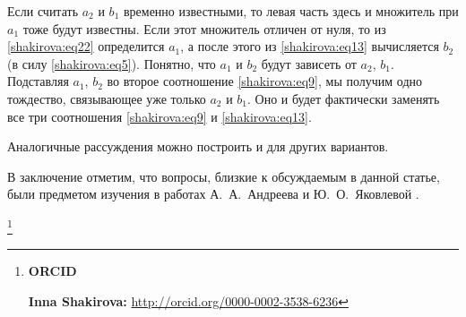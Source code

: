 Если считать $a_2$ и $b_1$ временно известными, то левая часть здесь и множитель при $a_1$ тоже будут известны.
Если этот множитель отличен от нуля, то из \eqref{shakirova:eq22} определится $a_1$, а после этого из \eqref{shakirova:eq13} вычисляется $b_2$ (в силу \eqref{shakirova:eq5}). 
Понятно, что $a_1$ и $b_2$ будут зависеть от $a_2$, $b_1$. 
Подставляя $a_1$, $b_2$ во второе соотношение \eqref{shakirova:eq9}, мы получим одно тождество, связывающее уже только $a_2$ и $b_1$. 
Оно и будет фактически заменять все три соотношения \eqref{shakirova:eq9} и \eqref{shakirova:eq13}.

Аналогичные рассуждения можно построить и для других вариантов.

В заключение отметим, что вопросы, близкие к обсуждаемым в данной статье, были предметом изучения в работах А.~А.~Андреева и Ю.~О.~Яковлевой \cite{shakirova:add3-ru, shakirova:add4-ru}.


\thanks{{\bf ORCID}

{\bf Inna Shakirova:} \url{http://orcid.org/0000-0002-3538-6236}
}

\RusRef


